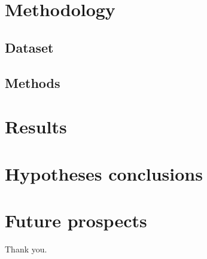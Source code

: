 \documentclass[a4paper,9pt]{beamer}
\theoremstyle{mytheoremstyle}
\begin{document}
\section{Methodology}

\subsection{Dataset}

\subsection{Methods}


\section{Results}

\section{Hypotheses conclusions}

\section{Future prospects}

\begin{frame}

\begin{center}
Thank you.
\end{center}
\end{frame}
\end{document}
